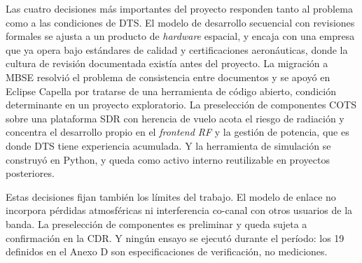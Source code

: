 Las cuatro decisiones más importantes del proyecto responden tanto al problema como a las condiciones de DTS. El modelo de desarrollo secuencial con revisiones formales se ajusta a un producto de \textit{hardware} espacial, y encaja con una empresa que ya opera bajo estándares de calidad y certificaciones aeronáuticas, donde la cultura de revisión documentada existía antes del proyecto. La migración a MBSE resolvió el problema de consistencia entre documentos y se apoyó en Eclipse Capella por tratarse de una herramienta de código abierto, condición determinante en un proyecto exploratorio. La preselección de componentes COTS sobre una plataforma SDR con herencia de vuelo acota el riesgo de radiación y concentra el desarrollo propio en el \textit{frontend RF} y la gestión de potencia, que es donde DTS tiene experiencia acumulada. Y la herramienta de simulación se construyó en Python, y queda como activo interno reutilizable en proyectos posteriores.

Estas decisiones fijan también los límites del trabajo. El modelo de enlace no incorpora pérdidas atmosféricas ni interferencia co-canal con otros usuarios de la banda. La preselección de componentes es preliminar y queda sujeta a confirmación en la CDR. Y ningún ensayo se ejecutó durante el período: los 19 definidos en el Anexo D son especificaciones de verificación, no mediciones.
